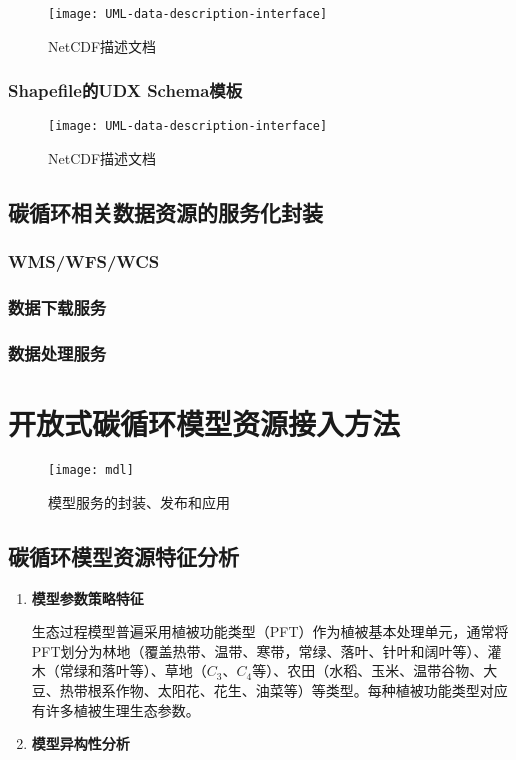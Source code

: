 \begin{figure}[!htbp]
    \centering
    \texttt{[image: UML-data-description-interface]}
    \caption{NetCDF描述文档}
    \label{fig:UML-data-description-interface}
\end{figure}

\subsubsection{Shapefile的UDX Schema模板}

\begin{figure}[!htbp]
    \centering
    \texttt{[image: UML-data-description-interface]}
    \caption{NetCDF描述文档}
    \label{fig:UML-data-description-interface}
\end{figure}

\subsection{碳循环相关数据资源的服务化封装}
\subsubsection{WMS/WFS/WCS}
\subsubsection{数据下载服务}
\subsubsection{数据处理服务}

\section{开放式碳循环模型资源接入方法}

\begin{figure}[!htbp]
    \centering
    \texttt{[image: mdl]}
    \caption{模型服务的封装、发布和应用}
    \label{fig:mdl}
\end{figure}

\subsection{碳循环模型资源特征分析}
\begin{enumerate}[(1)]
    \item \textbf{模型参数策略特征}
    
    生态过程模型普遍采用植被功能类型（PFT）作为植被基本处理单元，通常将PFT划分为林地（覆盖热带、温带、寒带，常绿、落叶、针叶和阔叶等）、灌木（常绿和落叶等）、草地（$C_3$、$C_4$等）、农田（水稻、玉米、温带谷物、大豆、热带根系作物、太阳花、花生、油菜等）等类型。每种植被功能类型对应有许多植被生理生态参数。

    \item \textbf{模型异构性分析}
    

\end{enumerate}

